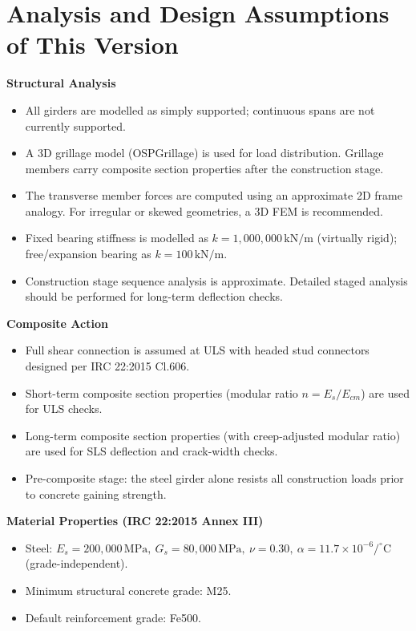 \documentclass[12pt,a4paper]{report}
\numberwithin{table}{chapter}
\numberwithin{figure}{chapter}
\begin{document}
\clearpage
\section{Analysis and Design Assumptions of This Version}
\label{sec:assumptions}

\textbf{Structural Analysis}

\begin{itemize}
    \item All girders are modelled as simply supported; continuous spans are not currently supported.
    \item A 3D grillage model (OSPGrillage) is used for load distribution. Grillage members carry composite section properties after the construction stage.
    \item The transverse member forces are computed using an approximate 2D frame analogy. For irregular or skewed geometries, a 3D FEM is recommended.
    \item Fixed bearing stiffness is modelled as $k = 1{,}000{,}000 \,\text{kN/m}$ (virtually rigid); free/expansion bearing as $k = 100 \, \text{kN/m}$.
    \item Construction stage sequence analysis is approximate. Detailed staged analysis should be performed for long-term deflection checks.
\end{itemize}

\textbf{Composite Action}

\begin{itemize}
    \item Full shear connection is assumed at ULS with headed stud connectors designed per IRC 22:2015 Cl.606.
    \item Short-term composite section properties (modular ratio $n = E_s/E_{cm}$) are used for ULS checks.
    \item Long-term composite section properties (with creep-adjusted modular ratio) are used for SLS deflection and crack-width checks.
    \item Pre-composite stage: the steel girder alone resists all construction loads prior to concrete gaining strength.
\end{itemize}


\textbf{Material Properties (IRC 22:2015 Annex III)}

\begin{itemize}
\item Steel: $E_s = 200{,}000 \, \text{MPa}, \ G_s = 80{,}000 \, \text{MPa}, \ \nu = 0.30, \ \alpha = 11.7 \times 10^{-6}/^\circ\mathrm{C}$ (grade-independent).
\item Minimum structural concrete grade: M25.
\item Default reinforcement grade: Fe500.
\end{itemize}
\end{document}
